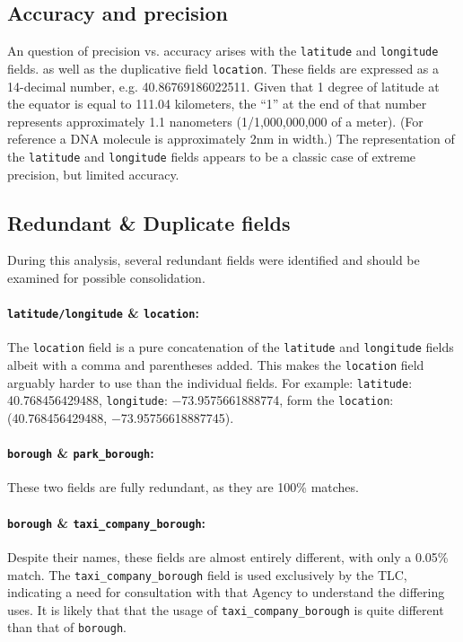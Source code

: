 \documentclass[linenumber]{jdsart}
\begin{document}
\subsection{Accuracy and precision}
\label{sec:precision}
An question of precision vs. accuracy arises with the \texttt{latitude} 
and \texttt{longitude} fields. as well as the duplicative 
field \texttt{location}. These fields are expressed as 
a 14\mbox{-}decimal number, e.g. 40.86769186022511. Given 
that 1 degree of latitude at the equator is equal to 111.04 
kilometers, the ``1'' at the end of that number represents 
approximately 1.1 nanometers (1/1,000,000,000 of a meter). (For 
reference a DNA molecule is approximately 2nm in width.) The 
representation of the \texttt{latitude} and \texttt{longitude} fields
appears to be a classic case of extreme precision, but limited accuracy. 


\subsection{Redundant \& Duplicate fields}
\label{sec:duplicates}
During this analysis, several redundant fields were identified and should 
be examined for possible consolidation.

\paragraph{\texttt{latitude/longitude} \& \texttt{location}:} 
The \texttt{location} field is a pure concatenation of 
the \texttt{latitude} and \texttt{longitude} fields albeit with a 
comma and parentheses added. This makes the \texttt{location} field 
arguably harder to use than the individual fields. For example:  
\texttt{latitude}: 40.768456429488, \texttt{longitude}: $-$73.9575661888774, 
form the \texttt{location}: (40.768456429488, $-$73.95756618887745).

\paragraph{\texttt{borough} \& \texttt{park\_borough}:} These two fields are fully redundant, 
as they are 100\% matches.

\paragraph{\texttt{borough} \& \texttt{taxi\_company\_borough}:} Despite 
their names, these fields are almost entirely different, with only 
a 0.05\% match. The \texttt{taxi\_company\_borough} field is 
used exclusively by the TLC, indicating a need for consultation 
with that Agency to understand the differing uses. It is 
likely that that the usage of \texttt{taxi\_company\_borough} is 
quite different than that of \texttt{borough}. 
\end{document}
